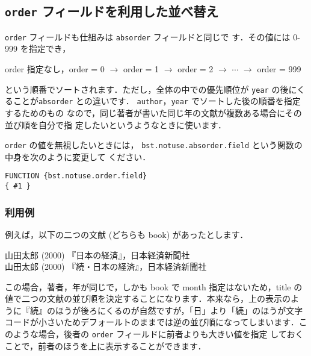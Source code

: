 \documentclass[a4j,10pt]{jarticle}
\begin{document}
\subsection{\texttt{order} フィールドを利用した並べ替え}

\texttt{order} フィールドも仕組みは \texttt{absorder} フィールドと同じで
す．その値には 0-999 を指定でき，

\begin{screen}
 \begin{center}
 order 指定なし，order = 0  $\rightarrow$ order = 1 $\rightarrow$ order = 2
 $\rightarrow$ $\cdots$ $\rightarrow$ order = 999
 \end{center}
\end{screen}

\noindent という順番でソートされます．ただし，全体の中での優先順位が 
\texttt{year} の後にくることが\texttt{absorder} との違いです．
\texttt{author}，\texttt{year} でソートした後の順番を指定するためのもの
なので，同じ著者が書いた同じ年の文献が複数ある場合にその並び順を自分で指
定したいというようなときに使います．

\texttt{order} の値を無視したいときには，
\texttt{bst.notuse.absorder.field} という関数の中身を次のように変更して
ください．
\begin{screen}
\begin{verbatim}
FUNCTION {bst.notuse.order.field}
{ #1 }
\end{verbatim}
\end{screen}


\subsubsection{利用例}

例えば，以下の二つの文献 (どちらも book) があったとします．
\begin{screen}
\begin{flushleft}
 山田太郎 (2000) 『日本の経済』，日本経済新聞社\\
 山田太郎 (2000) 『続・日本の経済』，日本経済新聞社
\end{flushleft}
\end{screen}

この場合，著者，年が同じで，しかも book で month 指定はないため，title 
の値で二つの文献の並び順を決定することになります．本来なら，上の表示のよ
うに『続』のほうが後ろにくるのが自然ですが，「日」より「続」のほうが文字
コードが小さいためデフォールトのままでは逆の並び順になってしまいます．こ
のような場合，後者の \texttt{order} フィールドに前者よりも大きい値を指定
しておくことで，前者のほうを上に表示することができます．
\end{document}
